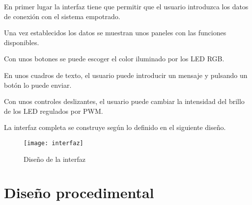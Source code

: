 En primer lugar la interfaz tiene que permitir que el usuario introduzca
los datos de conexión con el sistema empotrado.


Una vez establecidos los datos se muestran unos paneles con las funciones
disponibles.

Con unos botones se puede escoger el color iluminado por los LED RGB.


En unos cuadros de texto, el usuario puede introducir un mensaje y pulsando
un botón lo puede enviar.

\clearpage

Con unos controles deslizantes, el usuario puede cambiar la intensidad del brillo
de los LED regulados por PWM.

\clearpage

La interfaz completa se construye según lo definido en el siguiente diseño.

\begin{figure}[H]
  \centering
  \texttt{[image: interfaz]}
  \caption{Diseño de la interfaz} \label{fig:intefaz}
\end{figure}

\section{Diseño procedimental}
